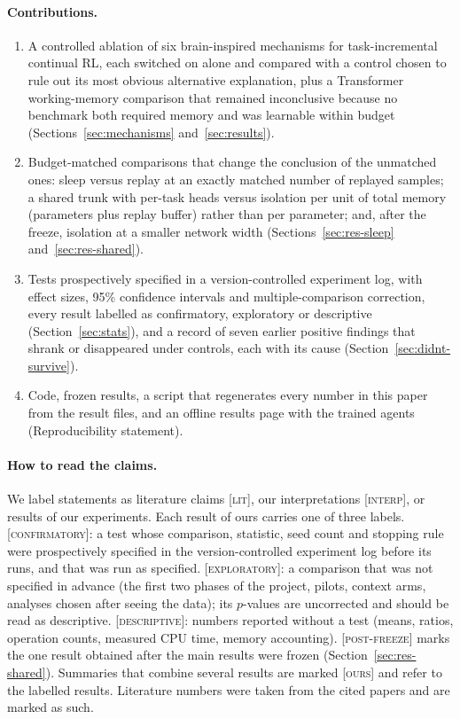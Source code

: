 \documentclass[10pt]{article}
\newcommand{\lit}{\textsc{[lit]}\xspace}
\newcommand{\ours}{\textsc{[ours]}\xspace}
\newcommand{\interp}{\textsc{[interp]}\xspace}
\newcommand{\conf}{\textsc{[confirmatory]}\xspace}
\newcommand{\expl}{\textsc{[exploratory]}\xspace}
\newcommand{\desc}{\textsc{[descriptive]}\xspace}
\newcommand{\postfz}{\textsc{[post-freeze]}\xspace}
\begin{document}
\paragraph{Contributions.}
\begin{enumerate}
  \item A controlled ablation of six brain-inspired mechanisms for task-incremental continual RL, each switched on
        alone and compared with a control chosen to rule out its most obvious alternative explanation, plus a
        Transformer working-memory comparison that remained inconclusive because no benchmark both required memory
        and was learnable within budget (Sections~\ref{sec:mechanisms} and~\ref{sec:results}).
  \item Budget-matched comparisons that change the conclusion of the unmatched ones: sleep versus replay at an
        exactly matched number of replayed samples; a shared trunk with per-task heads versus isolation per unit of
        total memory (parameters plus replay buffer) rather than per parameter; and, after the freeze, isolation at
        a smaller network width (Sections~\ref{sec:res-sleep} and~\ref{sec:res-shared}).
  \item Tests prospectively specified in a version-controlled experiment log, with effect sizes, 95\% confidence
        intervals and multiple-comparison correction, every result labelled as confirmatory, exploratory or
        descriptive (Section~\ref{sec:stats}), and a record of seven earlier positive findings that shrank or
        disappeared under controls, each with its cause (Section~\ref{sec:didnt-survive}).
  \item Code, frozen results, a script that regenerates every number in this paper from the result files, and an
        offline results page with the trained agents (Reproducibility statement).
\end{enumerate}

\paragraph{How to read the claims.} We label statements as literature claims \lit, our interpretations \interp, or
results of our experiments. Each result of ours carries one of three labels. \conf: a test whose comparison,
statistic, seed count and stopping rule were prospectively specified in the version-controlled experiment log before
its runs, and that was run as specified. \expl: a comparison that was not specified in advance (the first two phases
of the project, pilots, context arms, analyses chosen after seeing the data); its $p$-values are uncorrected and
should be read as descriptive. \desc: numbers reported without a test (means, ratios, operation counts, measured CPU
time, memory accounting). \postfz marks the one result obtained after the main results were frozen
(Section~\ref{sec:res-shared}). Summaries that combine several results are marked \ours and refer to the labelled
results. Literature numbers were taken from the cited papers and are marked as such.
\end{document}
